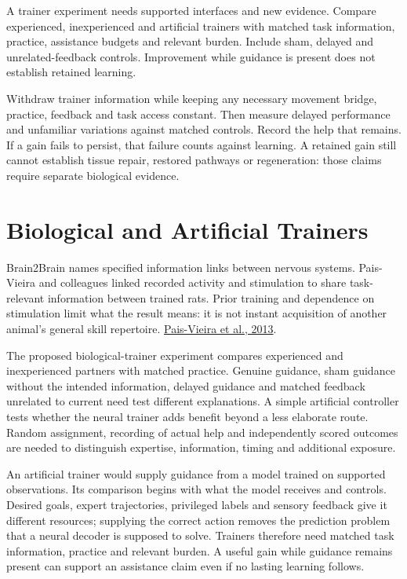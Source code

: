 A trainer experiment needs supported interfaces and new evidence. Compare experienced, inexperienced and artificial trainers with matched task information, practice, assistance budgets and relevant burden. Include sham, delayed and unrelated-feedback controls. Improvement while guidance is present does not establish retained learning.\par

Withdraw trainer information while keeping any necessary movement bridge, practice, feedback and task access constant. Then measure delayed performance and unfamiliar variations against matched controls. Record the help that remains. If a gain fails to persist, that failure counts against learning. A retained gain still cannot establish tissue repair, restored pathways or regeneration: those claims require separate biological evidence.\par

\section{Biological and Artificial Trainers}

Brain2Brain names specified information links between nervous systems. Pais-Vieira and colleagues linked recorded activity and stimulation to share task-relevant information between trained rats. Prior training and dependence on stimulation limit what the result means: it is not instant acquisition of another animal's general skill repertoire. \href{https://www.nature.com/articles/srep01319}{Pais-Vieira et al., 2013}.\par

The proposed biological-trainer experiment compares experienced and inexperienced partners with matched practice. Genuine guidance, sham guidance without the intended information, delayed guidance and matched feedback unrelated to current need test different explanations. A simple artificial controller tests whether the neural trainer adds benefit beyond a less elaborate route. Random assignment, recording of actual help and independently scored outcomes are needed to distinguish expertise, information, timing and additional exposure.\par

An artificial trainer would supply guidance from a model trained on supported observations. Its comparison begins with what the model receives and controls. Desired goals, expert trajectories, privileged labels and sensory feedback give it different resources; supplying the correct action removes the prediction problem that a neural decoder is supposed to solve. Trainers therefore need matched task information, practice and relevant burden. A useful gain while guidance remains present can support an assistance claim even if no lasting learning follows.\par

